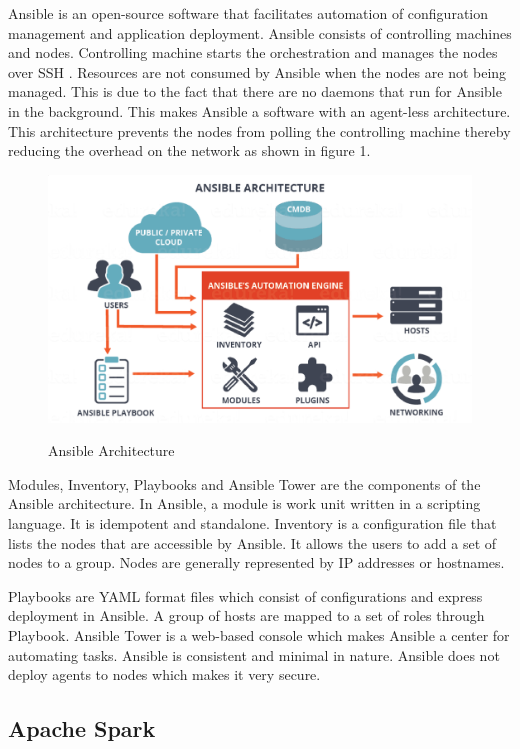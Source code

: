 \documentclass[9pt,twocolumn,twoside]{../../styles/osajnl}
\begin{document}
Ansible is an open-source software that facilitates automation of
configuration management and application deployment. Ansible consists
of controlling machines and nodes. Controlling machine starts the
orchestration and manages the nodes over SSH
\cite{ansibleWiki}. Resources are not consumed by Ansible when the
nodes are not being managed. This is due to the fact that there are no
daemons that run for Ansible in the background. This makes Ansible a
software with an agent-less architecture. This architecture prevents
the nodes from polling the controlling machine thereby reducing the
overhead on the network as shown in figure 1.

\begin{figure}[ht]
  \includegraphics[scale=0.4]{images/ansible_architecture.eps}
  \caption{Ansible Architecture} \cite{ansibleArch}
\end{figure}

Modules, Inventory, Playbooks and Ansible Tower are the components of
the Ansible architecture. In Ansible, a module is work unit written in
a scripting language. It is idempotent and standalone. Inventory is a
configuration file that lists the nodes that are accessible by
Ansible. It allows the users to add a set of nodes to a group. Nodes
are generally represented by IP addresses or hostnames.

Playbooks are YAML format files which consist of configurations and
express deployment in Ansible. A group of hosts are mapped to a set of
roles through Playbook. Ansible Tower is a web-based console which
makes Ansible a center for automating tasks. Ansible is consistent and
minimal in nature. Ansible does not deploy agents to nodes which makes
it very secure.

\subsection{Apache Spark}
\end{document}
